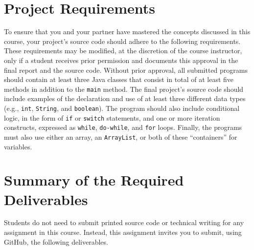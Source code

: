 \documentclass[11pt]{article}
\begin{document}
\section*{Project Requirements}

To ensure that you and your partner have mastered the concepts discussed in this course, your project's source code
should adhere to the following requirements. These requirements may be modified, at the discretion of the course
instructor, only if a student receives prior permission and documents this approval in the final report and the source
code. Without prior approval, all submitted programs should contain at least three Java classes that consist in total of
at least five methods in addition to the {\tt main} method. The final project's source code should include examples of
the declaration and use of at least three different data types (e.g., {\tt int}, {\tt String}, and {\tt boolean}). The
program should also include conditional logic, in the form of {\tt if} or {\tt switch} statements, and one or more
iteration constructs, expressed as {\tt while}, {\tt do-while}, and {\tt for} loops. Finally, the programs must also use
either an array, an {\tt ArrayList}, or both of these ``containers'' for variables.

\section*{Summary of the Required Deliverables}

\noindent Students do not need to submit printed source code or technical writing for any assignment in this course.
Instead, this assignment invites you to submit, using GitHub, the following deliverables.
\end{document}

